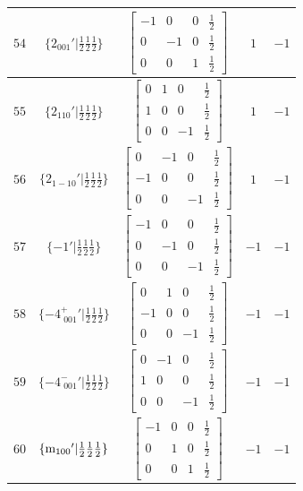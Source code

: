 \documentclass[fleqn,8pt]{jsarticle}
\begin{document}
\begin{longtable}{ccccc}
$ 54 $ & $ \{2{}_{001}{}'|\frac{1}{2} \frac{1}{2} \frac{1}{2}\} $ & $ \begin{bmatrix} -1 & 0 & 0 & \frac{1}{2} \\ 0 & -1 & 0 & \frac{1}{2} \\ 0 & 0 & 1 & \frac{1}{2} \end{bmatrix} $ & $ 1 $ & $ -1 $ \\ \hline
$ 55 $ & $ \{2{}_{110}{}'|\frac{1}{2} \frac{1}{2} \frac{1}{2}\} $ & $ \begin{bmatrix} 0 & 1 & 0 & \frac{1}{2} \\ 1 & 0 & 0 & \frac{1}{2} \\ 0 & 0 & -1 & \frac{1}{2} \end{bmatrix} $ & $ 1 $ & $ -1 $ \\ \hline
$ 56 $ & $ \{2{}_{1-10}{}'|\frac{1}{2} \frac{1}{2} \frac{1}{2}\} $ & $ \begin{bmatrix} 0 & -1 & 0 & \frac{1}{2} \\ -1 & 0 & 0 & \frac{1}{2} \\ 0 & 0 & -1 & \frac{1}{2} \end{bmatrix} $ & $ 1 $ & $ -1 $ \\ \hline
$ 57 $ & $ \{-1{}'|\frac{1}{2} \frac{1}{2} \frac{1}{2}\} $ & $ \begin{bmatrix} -1 & 0 & 0 & \frac{1}{2} \\ 0 & -1 & 0 & \frac{1}{2} \\ 0 & 0 & -1 & \frac{1}{2} \end{bmatrix} $ & $ -1 $ & $ -1 $ \\ \hline
$ 58 $ & $ \{-4^{+}_{\,\,001}{}'|\frac{1}{2} \frac{1}{2} \frac{1}{2}\} $ & $ \begin{bmatrix} 0 & 1 & 0 & \frac{1}{2} \\ -1 & 0 & 0 & \frac{1}{2} \\ 0 & 0 & -1 & \frac{1}{2} \end{bmatrix} $ & $ -1 $ & $ -1 $ \\ \hline
$ 59 $ & $ \{-4^{-}_{\,\,001}{}'|\frac{1}{2} \frac{1}{2} \frac{1}{2}\} $ & $ \begin{bmatrix} 0 & -1 & 0 & \frac{1}{2} \\ 1 & 0 & 0 & \frac{1}{2} \\ 0 & 0 & -1 & \frac{1}{2} \end{bmatrix} $ & $ -1 $ & $ -1 $ \\ \hline
$ 60 $ & $ \{{\rm m}_{100}{}'|\frac{1}{2} \frac{1}{2} \frac{1}{2}\} $ & $ \begin{bmatrix} -1 & 0 & 0 & \frac{1}{2} \\ 0 & 1 & 0 & \frac{1}{2} \\ 0 & 0 & 1 & \frac{1}{2} \end{bmatrix} $ & $ -1 $ & $ -1 $ \\ \hline

\end{longtable}
\end{document}
